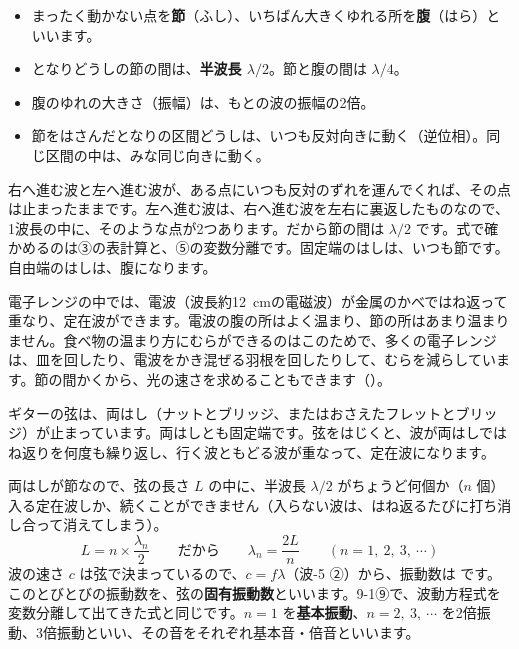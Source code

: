 \begin{itemize}[label={\color{bkTheme}●}, leftmargin=1.6\zw, itemsep=1pt, topsep=2pt]
\item まったく動かない点を\textbf{節}（ふし）、いちばん大きくゆれる所を\textbf{腹}（はら）といいます。
\item となりどうしの節の間は、\textbf{半波長 $\lambda/2$}。節と腹の間は $\lambda/4$。
\item 腹のゆれの大きさ（振幅）は、もとの波の振幅の2倍。
\item 節をはさんだとなりの区間どうしは、いつも反対向きに動く（逆位相）。同じ区間の中は、みな同じ向きに動く。
\end{itemize}

右へ進む波と左へ進む波が、ある点にいつも反対のずれを運んでくれば、その点は止まったままです。左へ進む波は、右へ進む波を左右に裏返したものなので、1波長の中に、そのような点が2つあります。だから節の間は $\lambda/2$ です。式で確かめるのは③の表計算と、⑤の変数分離です。固定端のはしは、いつも節です。自由端のはしは、腹になります。

\begin{phmijika}[電子レンジの中の定在波]
電子レンジの中では、電波（波長約\qty{12}{cm}の電磁波）が金属のかべではね返って重なり、定在波ができます。電波の腹の所はよく温まり、節の所はあまり温まりません。食べ物の温まり方にむらができるのはこのためで、多くの電子レンジは、皿を回したり、電波をかき混ぜる羽根を回したりして、むらを減らしています。節の間かくから、光の速さを求めることもできます（）。
\end{phmijika}


\label{ph:波-6:sec3}
\label{ph:波-6:gen}ギターの弦は、両はし（ナットとブリッジ、またはおさえたフレットとブリッジ）が止まっています。両はしとも固定端です。弦をはじくと、波が両はしではね返りを何度も繰り返し、行く波ともどる波が重なって、定在波になります。

両はしが節なので、弦の長さ $L$ の中に、半波長 $\lambda/2$ がちょうど何個か（$n$ 個）入る定在波しか、続くことができません（入らない波は、はね返るたびに打ち消し合って消えてしまう）。
\[L=n\times\frac{\lambda_n}{2}\qquad\text{だから}\qquad\lambda_n=\frac{2L}{n}\qquad(n=1,\ 2,\ 3,\ \cdots)\]
波の速さ $c$ は弦で決まっているので、$c=f\lambda$（波-5 ②）から、振動数は
です。このとびとびの振動数を、弦の\textbf{固有振動数}といいます。9-1⑨で、波動方程式を変数分離して出てきた式と同じです。$n=1$ を\textbf{基本振動}、$n=2,\ 3,\ \cdots$ を2倍振動、3倍振動といい、その音をそれぞれ基本音・倍音といいます。

